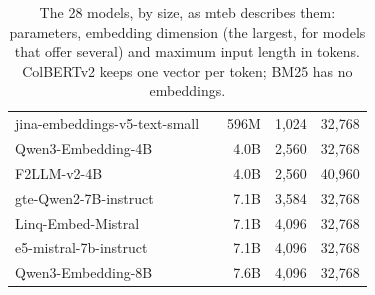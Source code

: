 \begin{table}[t]
\begin{tabular}{@{}llrrr@{}}
jina-embeddings-v5-text-small & \citealp{akram2026jinav5} & 596M & 1,024 & 32,768 \\
Qwen3-Embedding-4B & \citealp{zhang2025qwen3embedding} & 4.0B & 2,560 & 32,768 \\
F2LLM-v2-4B & \citealp{zhang2026f2llmv2} & 4.0B & 2,560 & 40,960 \\
gte-Qwen2-7B-instruct & \citealp{li2023gte} & 7.1B & 3,584 & 32,768 \\
Linq-Embed-Mistral & \citealp{choi2024linq} & 7.1B & 4,096 & 32,768 \\
e5-mistral-7b-instruct & \citealp{wang2024e5mistral} & 7.1B & 4,096 & 32,768 \\
Qwen3-Embedding-8B & \citealp{zhang2025qwen3embedding} & 7.6B & 4,096 & 32,768 \\
\bottomrule
\end{tabular}
\caption{The 28 models, by size, as mteb describes them: parameters, embedding dimension (the largest, for models that offer several) and maximum input length in tokens. ColBERTv2 keeps one vector per token; BM25 has no embeddings.}
\label{tab:models}
\end{table}
